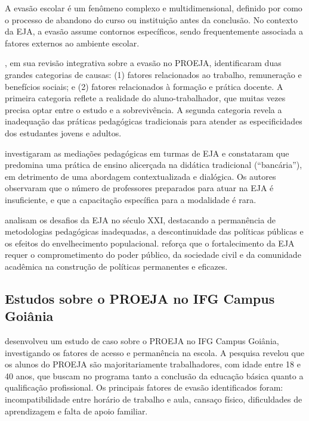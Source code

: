 \documentclass[12pt,a4paper]{article}
\begin{document}
A evasão escolar é um fenômeno complexo e multidimensional, definido por  como o processo de abandono do curso ou instituição antes da conclusão. No contexto da EJA, a evasão assume contornos específicos, sendo frequentemente associada a fatores externos ao ambiente escolar.

, em sua revisão integrativa sobre a evasão no PROEJA, identificaram duas grandes categorias de causas: (1) fatores relacionados ao trabalho, remuneração e benefícios sociais; e (2) fatores relacionados à formação e prática docente. A primeira categoria reflete a realidade do aluno-trabalhador, que muitas vezes precisa optar entre o estudo e a sobrevivência. A segunda categoria revela a inadequação das práticas pedagógicas tradicionais para atender as especificidades dos estudantes jovens e adultos.

 investigaram as mediações pedagógicas em turmas de EJA e constataram que predomina uma prática de ensino alicerçada na didática tradicional (``bancária''), em detrimento de uma abordagem contextualizada e dialógica. Os autores observaram que o número de professores preparados para atuar na EJA é insuficiente, e que a capacitação específica para a modalidade é rara.

 analisam os desafios da EJA no século XXI, destacando a permanência de metodologias pedagógicas inadequadas, a descontinuidade das políticas públicas e os efeitos do envelhecimento populacional.  reforça que o fortalecimento da EJA requer o comprometimento do poder público, da sociedade civil e da comunidade acadêmica na construção de políticas permanentes e eficazes.

\subsection{Estudos sobre o PROEJA no IFG Campus Goiânia}

 desenvolveu um estudo de caso sobre o PROEJA no IFG Campus Goiânia, investigando os fatores de acesso e permanência na escola. A pesquisa revelou que os alunos do PROEJA são majoritariamente trabalhadores, com idade entre 18 e 40 anos, que buscam no programa tanto a conclusão da educação básica quanto a qualificação profissional. Os principais fatores de evasão identificados foram: incompatibilidade entre horário de trabalho e aula, cansaço físico, dificuldades de aprendizagem e falta de apoio familiar.
\end{document}
